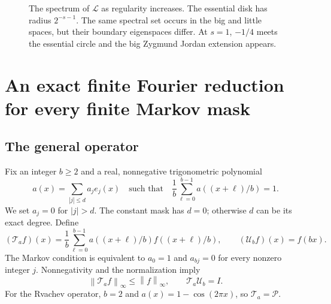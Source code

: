 \documentclass[11pt,a4paper]{article}
\numberwithin{equation}{section}
\theoremstyle{definition}
\theoremstyle{remark}
\newcommand{\Pp}{\mathcal P}
\newcommand{\Ll}{\mathcal L}
\newcommand{\Ta}{\mathcal T_a}
\newcommand{\Ub}{\mathcal U_b}
\newcommand{\norm}[1]{\left\lVert#1\right\rVert}
\begin{document}
\begin{figure}[ht]
\centering
{}
\caption{The spectrum of $\Ll$ as regularity increases. The essential
disk has radius $2^{-s-1}$. The same spectral set occurs in the big and
little spaces, but their boundary eigenspaces differ. At $s=1$, $-1/4$
meets the essential circle and the big Zygmund Jordan extension appears.}
\label{fig:disks}
\end{figure}

\section{An exact finite Fourier reduction for every finite Markov mask}
\label{sec:finite-core}

\subsection{The general operator}
Fix an integer $b\ge2$ and a real, nonnegative trigonometric polynomial
\begin{equation}
 a(x)=\sum_{|j|\le d}a_j e_j(x)
 \quad\text{such that}\quad
 \frac1b\sum_{\ell=0}^{b-1}a((x+\ell)/b)=1.
 \label{eq:mask}
\end{equation}
We set $a_j=0$ for $|j|>d$. The constant mask has $d=0$; otherwise
$d$ can be its exact degree.
Define
\begin{equation}
 (\Ta f)(x)=\frac1b\sum_{\ell=0}^{b-1}
 a((x+\ell)/b)f((x+\ell)/b),\qquad
 (\Ub f)(x)=f(bx).
 \label{eq:general-transfer}
\end{equation}
The Markov condition is equivalent to $a_0=1$ and $a_{bj}=0$ for every
nonzero integer $j$. Nonnegativity and the normalization imply
\begin{equation}
 \norm{\Ta f}_\infty\le\norm f_\infty,
 \qquad \Ta\Ub=I.
 \label{eq:contraction-rightinverse}
\end{equation}
For the Rvachev operator, $b=2$ and $a(x)=1-\cos(2\pi x)$, so
$\Ta=\Pp$.
\end{document}
